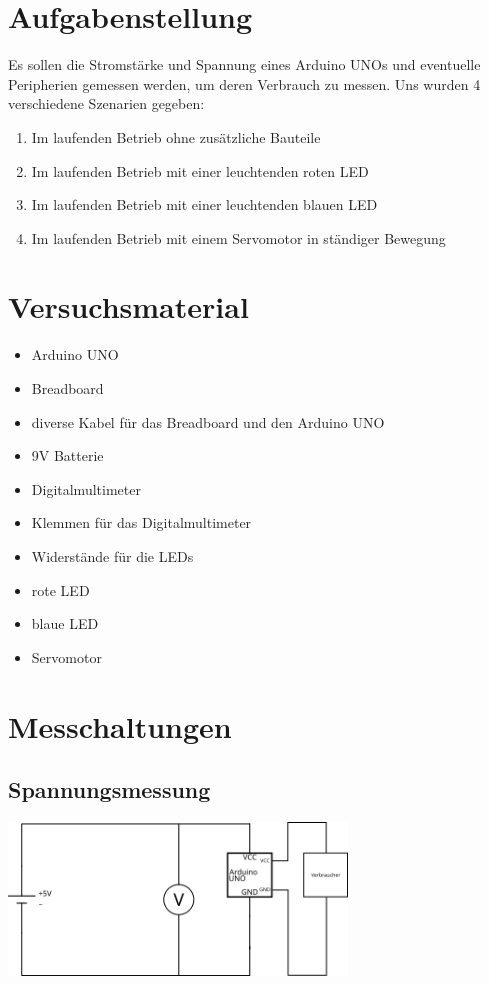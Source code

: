 \documentclass[8pt, letterpaper]{article}
\title{}
\author{Jakob Kirsch}
\date{\parbox{\linewidth}{\centering%
  \today\endgraf\bigskip
  Fach: IT\endgraf\medskip
  Betreür: Herr Kutzner\endgraf\medskip
}}
\begin{document}
\maketitle
\newpage

\section{Aufgabenstellung}
Es sollen die Stromstärke und Spannung eines Arduino UNOs und eventuelle Peripherien gemessen werden, um deren Verbrauch zu messen.
Uns wurden 4 verschiedene Szenarien gegeben:

\begin{enumerate}
  \item Im laufenden Betrieb ohne zusätzliche Bauteile
  \item Im laufenden Betrieb mit einer leuchtenden roten LED
  \item Im laufenden Betrieb mit einer leuchtenden blauen LED
  \item Im laufenden Betrieb mit einem Servomotor in ständiger Bewegung
\end{enumerate}

\section{Versuchsmaterial}
\begin{itemize}
  \item Arduino UNO
  \item Breadboard
  \item diverse Kabel für das Breadboard und den Arduino UNO
  \item 9V Batterie
  \item Digitalmultimeter
  \item Klemmen für das Digitalmultimeter
  \item Widerstände für die LEDs
  \item rote LED
  \item blaue LED
  \item Servomotor
\end{itemize}

\section{Messchaltungen}
\subsection{Spannungsmessung}
\includegraphics[width=9cm]{volt}
\end{document}
